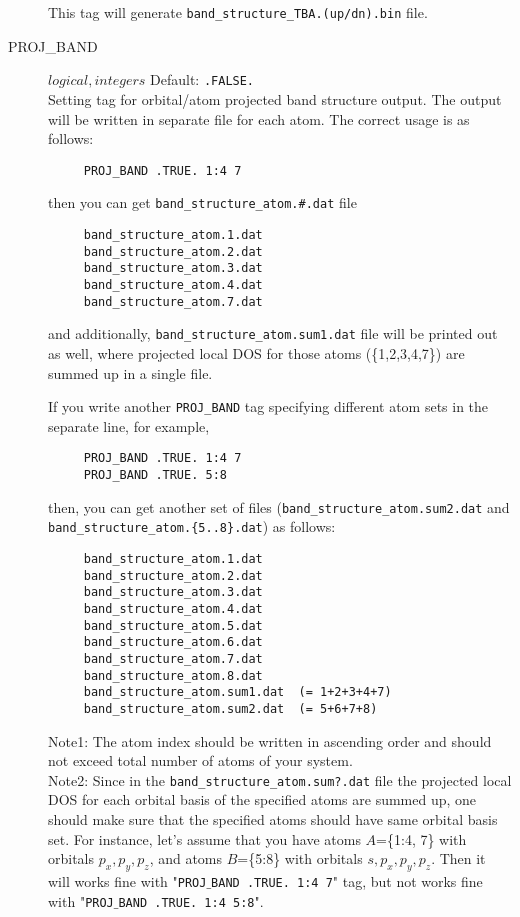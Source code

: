 \documentclass[a4paper,12pt]{scrartcl}
\makeatletter
\def\namedlabel#1#2{\begingroup
    #2%
    \def\@currentlabel{#2}%
    \phantomsection\label{#1}\endgroup
}
\newcommand{\textblue}[1]{\textcolor{blue!85!white}{\texttt{#1}}}
\makeatother
\begin{document}
\begin{description}
        This tag will generate \texttt{band\_structure\_TBA.(up/dn).}\textblue{bin} file.
        
    \item[\namedlabel{tag:PROJBAND}{PROJ\_BAND}] $logical, integers$ Default: \texttt{.FALSE.} \\
		Setting tag for orbital/atom projected band structure output. The output will be written in separate file for each atom. The correct usage is as follows: 
    \begin{verbatim}
     PROJ_BAND .TRUE. 1:4 7
    \end{verbatim}
    then you can get \texttt{band\_structure\_atom.\#.dat} file \\
    
        \begin{verbatim}
     band_structure_atom.1.dat
     band_structure_atom.2.dat
     band_structure_atom.3.dat
     band_structure_atom.4.dat
     band_structure_atom.7.dat
    \end{verbatim} 
    and additionally, \texttt{band\_structure\_atom.sum1.dat}     
    file will be printed out as well, where projected local DOS for those atoms (\{1,2,3,4,7\}) are summed up in a single file.
    
    If you write another \texttt{PROJ\_BAND} tag specifying different atom sets in the separate line,
    for example, 
    
    \begin{verbatim}
     PROJ_BAND .TRUE. 1:4 7
     PROJ_BAND .TRUE. 5:8
    \end{verbatim}
    
    then, you can get another set of files (\texttt{band\_structure\_atom.sum2.dat} and \\
    \texttt{band\_structure\_atom.\{5..8\}.dat}) as follows:
    \begin{verbatim}
     band_structure_atom.1.dat
     band_structure_atom.2.dat
     band_structure_atom.3.dat
     band_structure_atom.4.dat
     band_structure_atom.5.dat
     band_structure_atom.6.dat
     band_structure_atom.7.dat
     band_structure_atom.8.dat
     band_structure_atom.sum1.dat  (= 1+2+3+4+7) 
     band_structure_atom.sum2.dat  (= 5+6+7+8)
    \end{verbatim} 
       
    Note1: The atom index should be written in ascending order
    and should not exceed total number of atoms of your system. \\
    Note2: Since in the \texttt{band\_structure\_atom.sum?.dat} file 
    the projected local DOS for each orbital basis of the specified atoms are 
    summed up, one should make sure that the specified atoms should have same orbital basis set. For instance, let's assume that you have atoms $A$=\{1:4, 7\} with orbitals $p_x, p_y, p_z$, and atoms $B$=\{5:8\} with orbitals $s, p_x, p_y, p_z$. Then it will works fine with "\texttt{PROJ$\_$BAND .TRUE. 1:4 7}" tag, but not works fine with 
        "\texttt{PROJ$\_$BAND .TRUE. 1:4 5:8}".
     

\end{description}
\end{document}
